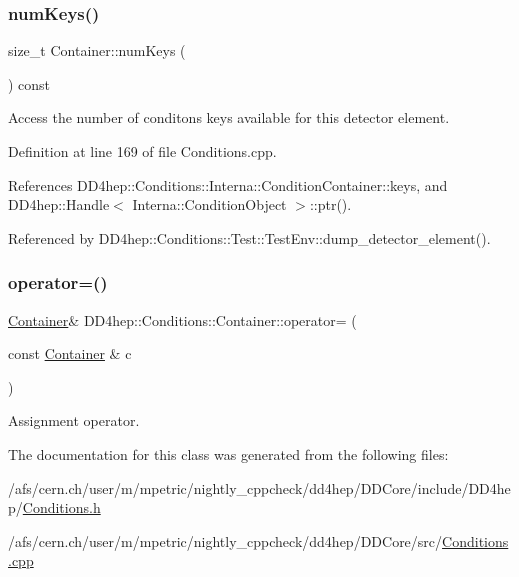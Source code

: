 \subsubsection{\texorpdfstring{num\+Keys()}{numKeys()}}
{\footnotesize\ttfamily size\+\_\+t Container\+::num\+Keys (\begin{DoxyParamCaption}{ }\end{DoxyParamCaption}) const}



Access the number of conditons keys available for this detector element. 



Definition at line 169 of file Conditions.\+cpp.



References D\+D4hep\+::\+Conditions\+::\+Interna\+::\+Condition\+Container\+::keys, and D\+D4hep\+::\+Handle$<$ Interna\+::\+Condition\+Object $>$\+::ptr().



Referenced by D\+D4hep\+::\+Conditions\+::\+Test\+::\+Test\+Env\+::dump\+\_\+detector\+\_\+element().

\hypertarget{class_d_d4hep_1_1_conditions_1_1_container_a8552c753d6e74cac2a89229026e85c3c}{}\label{class_d_d4hep_1_1_conditions_1_1_container_a8552c753d6e74cac2a89229026e85c3c} 
\subsubsection{\texorpdfstring{operator=()}{operator=()}}
{\footnotesize\ttfamily \hyperlink{class_d_d4hep_1_1_conditions_1_1_container}{Container}\& D\+D4hep\+::\+Conditions\+::\+Container\+::operator= (\begin{DoxyParamCaption}\item[{const \hyperlink{class_d_d4hep_1_1_conditions_1_1_container}{Container} \&}]{c }\end{DoxyParamCaption})\hspace{0.3cm}{\ttfamily [default]}}



Assignment operator. 



The documentation for this class was generated from the following files\+:\begin{DoxyCompactItemize}
\item 
/afs/cern.\+ch/user/m/mpetric/nightly\+\_\+cppcheck/dd4hep/\+D\+D\+Core/include/\+D\+D4hep/\hyperlink{_conditions_8h}{Conditions.\+h}\item 
/afs/cern.\+ch/user/m/mpetric/nightly\+\_\+cppcheck/dd4hep/\+D\+D\+Core/src/\hyperlink{_conditions_8cpp}{Conditions.\+cpp}\end{DoxyCompactItemize}
